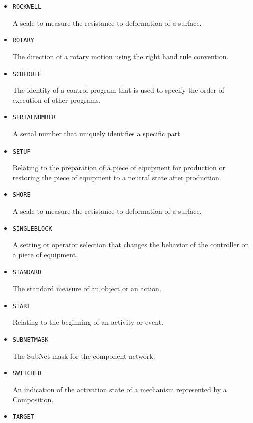 \begin{itemize}
\item \texttt{ROCKWELL}  

A scale to measure the resistance to deformation of a surface.


\item \texttt{ROTARY}  

The direction of a rotary motion using the right hand rule convention.


\item \texttt{SCHEDULE}  

The identity of a control program that is used to specify the order of execution of other programs.


\item \texttt{SERIAL\textunderscore NUMBER}  

A serial number that uniquely identifies a specific part.


\item \texttt{SET\textunderscore UP}  

Relating to the preparation of a piece of equipment for production or restoring the piece of equipment to a neutral state after production.


\item \texttt{SHORE}  

A scale to measure the resistance to deformation of a surface.


\item \texttt{SINGLE\textunderscore BLOCK}  

A setting or operator selection that changes the behavior of the controller on a piece of equipment. 


\item \texttt{STANDARD}  

The standard measure of an object or an action.


\item \texttt{START}  

Relating to the beginning of an activity or event.


\item \texttt{SUBNET\textunderscore MASK}  

The SubNet mask for the component network.



\item \texttt{SWITCHED}  

An indication of the activation state of a mechanism represented by a \gls{Composition}.


\item \texttt{TARGET}  


\end{itemize}
